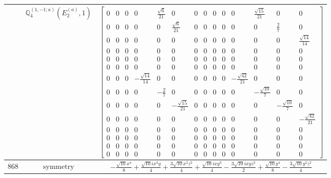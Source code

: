 \documentclass[fleqn,8pt,landscape]{jsarticle}
\begin{document}
\begin{longtable}{ccc}
$  $ & $ \mathbb{Q}_{4}^{(1,-1;a)}(E_{2}^{(a)},1) $ & $ \begin{bmatrix} 0 & 0 & 0 & 0 & \frac{\sqrt{6}}{21} & 0 & 0 & 0 & 0 & 0 & 0 & \frac{\sqrt{15}}{21} & 0 & 0 \\ 0 & 0 & 0 & 0 & 0 & \frac{\sqrt{6}}{21} & 0 & 0 & 0 & 0 & 0 & 0 & \frac{2}{7} & 0 \\ 0 & 0 & 0 & 0 & 0 & 0 & 0 & 0 & 0 & 0 & 0 & 0 & 0 & \frac{\sqrt{14}}{14} \\ 0 & 0 & 0 & 0 & 0 & 0 & 0 & 0 & 0 & 0 & 0 & 0 & 0 & 0 \\ 0 & 0 & 0 & 0 & 0 & 0 & 0 & 0 & 0 & 0 & 0 & 0 & 0 & 0 \\ 0 & 0 & 0 & 0 & 0 & 0 & 0 & 0 & 0 & 0 & 0 & 0 & 0 & 0 \\ 0 & 0 & 0 & - \frac{\sqrt{14}}{14} & 0 & 0 & 0 & 0 & 0 & 0 & - \frac{\sqrt{42}}{21} & 0 & 0 & 0 \\ 0 & 0 & 0 & 0 & - \frac{2}{7} & 0 & 0 & 0 & 0 & 0 & 0 & - \frac{\sqrt{10}}{7} & 0 & 0 \\ 0 & 0 & 0 & 0 & 0 & - \frac{\sqrt{15}}{21} & 0 & 0 & 0 & 0 & 0 & 0 & - \frac{\sqrt{10}}{7} & 0 \\ 0 & 0 & 0 & 0 & 0 & 0 & 0 & 0 & 0 & 0 & 0 & 0 & 0 & - \frac{\sqrt{42}}{21} \\ 0 & 0 & 0 & 0 & 0 & 0 & 0 & 0 & 0 & 0 & 0 & 0 & 0 & 0 \\ 0 & 0 & 0 & 0 & 0 & 0 & 0 & 0 & 0 & 0 & 0 & 0 & 0 & 0 \\ 0 & 0 & 0 & 0 & 0 & 0 & 0 & 0 & 0 & 0 & 0 & 0 & 0 & 0 \\ 0 & 0 & 0 & 0 & 0 & 0 & 0 & 0 & 0 & 0 & 0 & 0 & 0 & 0 \end{bmatrix} $ \\ \hline
$ 868 $ & $ \text{symmetry} $ & $ - \frac{\sqrt{10} x^{4}}{8} + \frac{\sqrt{10} i x^{3} y}{4} + \frac{3 \sqrt{10} x^{2} z^{2}}{4} + \frac{\sqrt{10} i x y^{3}}{4} - \frac{3 \sqrt{10} i x y z^{2}}{2} + \frac{\sqrt{10} y^{4}}{8} - \frac{3 \sqrt{10} y^{2} z^{2}}{4} $ \\

\end{longtable}
\end{document}
